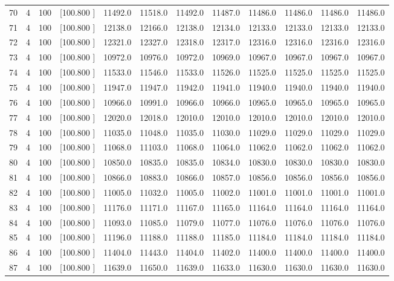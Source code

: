 \documentclass[12pt,a4paper]{article}
\begin{document}
\begin{center}
{\begin{tabular}{r r r r r r r r r r r r}
  70&  4&100&[100.800   ]& 11492.0& 11518.0& 11492.0& 11487.0& 11486.0& 11486.0& 11486.0& 11486.0\\[-0.02in]
  71&  4&100&[100.800   ]& 12138.0& 12166.0& 12138.0& 12134.0& 12133.0& 12133.0& 12133.0& 12133.0\\[-0.02in]
  72&  4&100&[100.800   ]& 12321.0& 12327.0& 12318.0& 12317.0& 12316.0& 12316.0& 12316.0& 12316.0\\[-0.02in]
  73&  4&100&[100.800   ]& 10972.0& 10976.0& 10972.0& 10969.0& 10967.0& 10967.0& 10967.0& 10967.0\\[-0.02in]
  74&  4&100&[100.800   ]& 11533.0& 11546.0& 11533.0& 11526.0& 11525.0& 11525.0& 11525.0& 11525.0\\[-0.02in]
  75&  4&100&[100.800   ]& 11947.0& 11947.0& 11942.0& 11941.0& 11940.0& 11940.0& 11940.0& 11940.0\\[-0.02in]
  76&  4&100&[100.800   ]& 10966.0& 10991.0& 10966.0& 10966.0& 10965.0& 10965.0& 10965.0& 10965.0\\[-0.02in]
  77&  4&100&[100.800   ]& 12020.0& 12018.0& 12010.0& 12010.0& 12010.0& 12010.0& 12010.0& 12010.0\\[-0.02in]
  78&  4&100&[100.800   ]& 11035.0& 11048.0& 11035.0& 11030.0& 11029.0& 11029.0& 11029.0& 11029.0\\[-0.02in]
  79&  4&100&[100.800   ]& 11068.0& 11103.0& 11068.0& 11064.0& 11062.0& 11062.0& 11062.0& 11062.0\\[-0.02in]
  80&  4&100&[100.800   ]& 10850.0& 10835.0& 10835.0& 10834.0& 10830.0& 10830.0& 10830.0& 10830.0\\[-0.02in]
  81&  4&100&[100.800   ]& 10866.0& 10883.0& 10866.0& 10857.0& 10856.0& 10856.0& 10856.0& 10856.0\\[-0.02in]
  82&  4&100&[100.800   ]& 11005.0& 11032.0& 11005.0& 11002.0& 11001.0& 11001.0& 11001.0& 11001.0\\[-0.02in]
  83&  4&100&[100.800   ]& 11176.0& 11171.0& 11167.0& 11165.0& 11164.0& 11164.0& 11164.0& 11164.0\\[-0.02in]
  84&  4&100&[100.800   ]& 11093.0& 11085.0& 11079.0& 11077.0& 11076.0& 11076.0& 11076.0& 11076.0\\[-0.02in]
  85&  4&100&[100.800   ]& 11196.0& 11188.0& 11188.0& 11185.0& 11184.0& 11184.0& 11184.0& 11184.0\\[-0.02in]
  86&  4&100&[100.800   ]& 11404.0& 11443.0& 11404.0& 11402.0& 11400.0& 11400.0& 11400.0& 11400.0\\[-0.02in]
  87&  4&100&[100.800   ]& 11639.0& 11650.0& 11639.0& 11633.0& 11630.0& 11630.0& 11630.0& 11630.0\\[-0.02in]

\end{tabular}}
\end{center}
\end{document}
